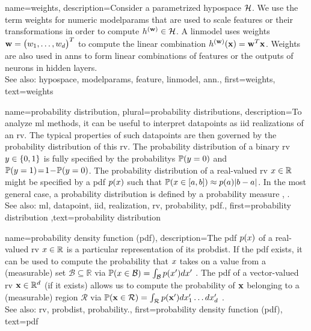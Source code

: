 {name={weights},
	description={Consider a parametrized \gls{hypospace} $\mathcal{H}$. 
		We use the term weights for numeric \gls{modelparams} that are 
		used to scale \glspl{feature} or their transformations in order to 
		compute $h^{({\bf w})} \in \mathcal{H}$. A \gls{linmodel} uses weights ${\bf w}=\big(w_{1},\ldots,w_{d}\big)^{T}$ to compute 
		the linear combination $h^{({\bf w})}({\bf x})= {\bf w}^{T} {\bf x}$. 
		Weights are also used in \glspl{ann} to form linear combinations of \glspl{feature} or the 
		outputs of neurons in hidden layers.
				\\
		See also: \gls{hypospace}, \gls{modelparams}, \gls{feature}, \gls{linmodel}, \gls{ann}.},
	first={weights},
	text={weights}
}
	
{name={probability distribution}, plural={probability distributions},
	description={To analyze \gls{ml} methods, it can be useful 
		to interpret \glspl{datapoint} as \gls{iid} \glspl{realization} of an \gls{rv}. The typical 
		properties of such \glspl{datapoint} are then governed by the \gls{probability} distribution 
		of this \gls{rv}. The \gls{probability} distribution of a binary \gls{rv} $y \in \{0,1\}$ 
		is fully specified by the \glspl{probability} $\mathbb{P}({y = 0})$ and 
		$\mathbb{P}({y=1})\!=\!1\!-\!\mathbb{P}({y=0})$. The \gls{probability} 
		distribution of a real-valued \gls{rv} $x \in \mathbb{R}$ might be specified 
		by a \gls{pdf} $p(x)$ such that $\mathbb{P}({ x \in [a,b] }) \approx  p(a) |b-a|$. 
	    	In the most general case, a \gls{probability} distribution is defined by a \gls{probability} measure \cite{BillingsleyProbMeasure}, \cite{GrayProbBook}.
	    		\\
		See also: \gls{ml}, \gls{datapoint}, \gls{iid}, \gls{realization}, \gls{rv}, \gls{probability}, \gls{pdf}.},
	first={probability distribution}
	,text={probability distribution}
}
    
    
{name={probability density function (pdf)},
	description={The pdf $p(x)$ 
		of a real-valued \gls{rv} $x \in \mathbb{R}$ is a particular representation of its \gls{probdist}. 
		If the pdf exists, it can be used to compute the \gls{probability} that $x$ takes on a value 
		from a (measurable) set $\mathcal{B} \subseteq \mathbb{R}$ via $\mathbb{P}({x \in \mathcal{B}}) = \int_{\mathcal{B}} p(x') d x'$ \cite[Ch. 3]{BertsekasProb}. 
		The pdf of a vector-valued \gls{rv} ${\bf x} \in \mathbb{R}^{d}$ (if it exists) 
        		allows us to compute the \gls{probability} of ${\bf x}$ belonging to a (measurable) region $\mathcal{R}$ via 
        		$\mathbb{P}({{\bf x} \in \mathcal{R}}) = \int_{\mathcal{R}} p({\bf x}') d x_{1}' \ldots d x_{d}' $ \cite[Ch. 3]{BertsekasProb}.
        		\\
		See also: \gls{rv}, \gls{probdist}, \gls{probability}.},
	first={probability density function (pdf)},
	text={pdf}
}


